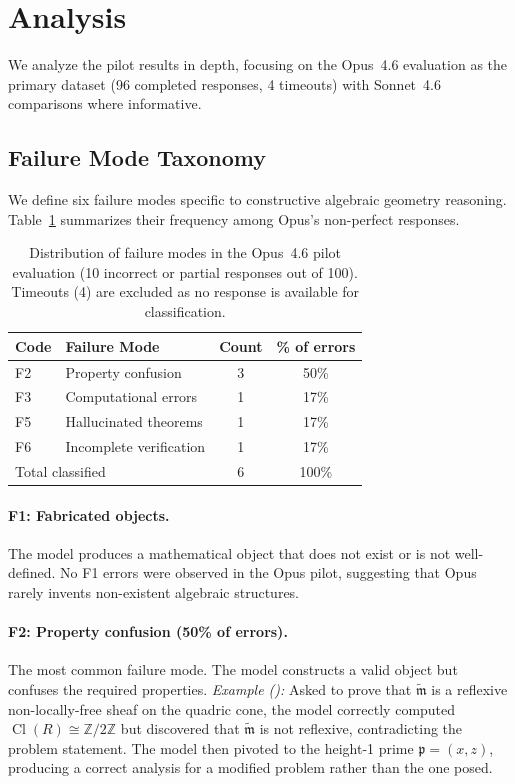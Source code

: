 \section{Analysis}
\label{sec:analysis}

We analyze the pilot results in depth, focusing on the Opus~4.6 evaluation as the primary dataset (96 completed responses, 4 timeouts) with Sonnet~4.6 comparisons where informative.

\subsection{Failure Mode Taxonomy}

We define six failure modes specific to constructive algebraic geometry reasoning.
Table~\ref{tab:failure-modes} summarizes their frequency among Opus's non-perfect responses.

\begin{table}[ht]
\centering
\caption{Distribution of failure modes in the Opus~4.6 pilot evaluation (10 incorrect or partial responses out of 100). Timeouts (4) are excluded as no response is available for classification.}
\label{tab:failure-modes}
\begin{tabular}{llcc}
\toprule
\textbf{Code} & \textbf{Failure Mode} & \textbf{Count} & \textbf{\% of errors} \\
\midrule
F2 & Property confusion & 3 & 50\% \\
F3 & Computational errors & 1 & 17\% \\
F5 & Hallucinated theorems & 1 & 17\% \\
F6 & Incomplete verification & 1 & 17\% \\
\midrule
\multicolumn{2}{l}{Total classified} & 6 & 100\% \\
\bottomrule
\end{tabular}
\end{table}

\paragraph{F1: Fabricated objects.}
The model produces a mathematical object that does not exist or is not well-defined.
No F1 errors were observed in the Opus pilot, suggesting that Opus rarely invents non-existent algebraic structures.

\paragraph{F2: Property confusion (50\% of errors).}
The most common failure mode.
The model constructs a valid object but confuses the required properties.
\emph{Example ():} Asked to prove that $\widetilde{\mathfrak{m}}$ is a reflexive non-locally-free sheaf on the quadric cone, the model correctly computed $\operatorname{Cl}(R) \cong \mathbb{Z}/2\mathbb{Z}$ but discovered that $\widetilde{\mathfrak{m}}$ is not reflexive, contradicting the problem statement.
The model then pivoted to the height-1 prime $\mathfrak{p} = (x,z)$, producing a correct analysis for a modified problem rather than the one posed.

